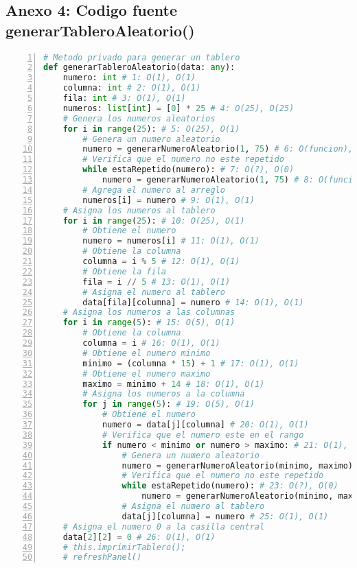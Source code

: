 \documentclass[10pt,twocolumn]{article}
\begin{document}
\subsection{Anexo 4: Codigo fuente generarTableroAleatorio()}
\begin{lstlisting}[language=python, caption={Algoritmo generarTableroAleatorio}, label={generarTableroAleatorio}, captionpos=b, basicstyle=\footnotesize\ttfamily, numbers=left, numberstyle=\tiny, numbersep=5pt, stepnumber=1, numberblanklines=true, frame=single, framesep=2mm, rulesepcolor=\color{black}]
# Metodo privado para generar un tablero
def generarTableroAleatorio(data: any):
	numero: int # 1: O(1), O(1)
	columna: int # 2: O(1), O(1)
	fila: int # 3: O(1), O(1)
	numeros: list[int] = [0] * 25 # 4: O(25), O(25)
	# Genera los numeros aleatorios 
	for i in range(25): # 5: O(25), O(1)
		# Genera un numero aleatorio
		numero = generarNumeroAleatorio(1, 75) # 6: O(funcion), O(1)
		# Verifica que el numero no este repetido
		while estaRepetido(numero): # 7: O(?), O(0)
			numero = generarNumeroAleatorio(1, 75) # 8: O(funcion), O(1)
		# Agrega el numero al arreglo
		numeros[i] = numero # 9: O(1), O(1)
	# Asigna los numeros al tablero
	for i in range(25): # 10: O(25), O(1)
		# Obtiene el numero
		numero = numeros[i] # 11: O(1), O(1)
		# Obtiene la columna
		columna = i % 5 # 12: O(1), O(1)
		# Obtiene la fila
		fila = i // 5 # 13: O(1), O(1)
		# Asigna el numero al tablero
		data[fila][columna] = numero # 14: O(1), O(1)
	# Asigna los numeros a las columnas
	for i in range(5): # 15: O(5), O(1)
		# Obtiene la columna
		columna = i # 16: O(1), O(1)
		# Obtiene el numero minimo
		minimo = (columna * 15) + 1 # 17: O(1), O(1)
		# Obtiene el numero maximo
		maximo = minimo + 14 # 18: O(1), O(1)
		# Asigna los numeros a la columna
		for j in range(5): # 19: O(5), O(1)
			# Obtiene el numero
			numero = data[j][columna] # 20: O(1), O(1)
			# Verifica que el numero este en el rango
			if numero < minimo or numero > maximo: # 21: O(1), O(0)
				# Genera un numero aleatorio
				numero = generarNumeroAleatorio(minimo, maximo) # 22: O(funcion), O(1)
				# Verifica que el numero no este repetido
				while estaRepetido(numero): # 23: O(?), O(0)
					numero = generarNumeroAleatorio(minimo, maximo) # 24: O(funcion), O(1)
				# Asigna el numero al tablero
				data[j][columna] = numero # 25: O(1), O(1)
	# Asigna el numero 0 a la casilla central
	data[2][2] = 0 # 26: O(1), O(1)
	# this.imprimirTablero();
	# refreshPanel()
\end{lstlisting}
\end{document}
